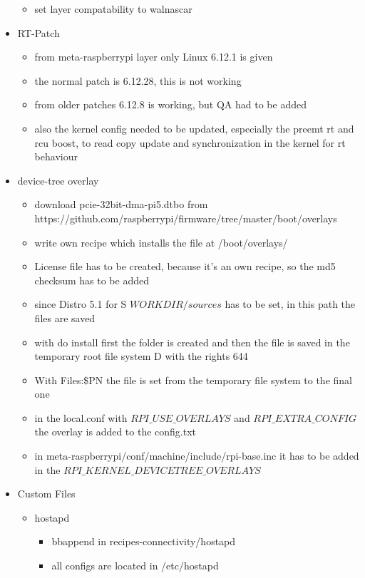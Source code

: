 \begin{itemize}
\begin{itemize}
        \item set layer compatability to walnascar
    \end{itemize}
    \item RT-Patch \begin{itemize}
        \item from meta-raspberrypi layer only Linux 6.12.1 is given
        \item the normal patch is 6.12.28, this is not working
        \item from older patches 6.12.8 is working, but QA had to be added
        \item also the kernel config needed to be updated, especially the preemt rt and rcu boost, to read copy update and synchronization in the kernel for rt behaviour
    \end{itemize}
    \item device-tree overlay \begin{itemize}
        \item download pcie-32bit-dma-pi5.dtbo from https://github.com/raspberrypi/firmware/tree/master/boot/overlays
        \item write own recipe which installs the file at /boot/overlays/
        \item License file has to be created, because it's an own recipe, so the md5 checksum has to be added
        \item since Distro 5.1 for S ${WORKDIR}/sources$ has to be set, in this path the files are saved
        \item with do install first the folder is created and then the file is saved in the temporary root file system D with the rights 644
        \item With Files:\${PN} the file is set from the temporary file system to the final one 
        \item in the local.conf with $RPI\_USE\_OVERLAYS$ and $RPI\_EXTRA\_CONFIG$ the overlay is added to the config.txt
        \item in meta-raspberrypi/conf/machine/include/rpi-base.inc it has to be added in the $RPI\_KERNEL\_DEVICETREE\_OVERLAYS$ 
    \end{itemize}
    \item Custom Files \begin{itemize}
        \item hostapd \begin{itemize}
            \item bbappend in recipes-connectivity/hostapd
            \item all configs are located in /etc/hostapd

\end{itemize}
\end{itemize}
\end{itemize}

